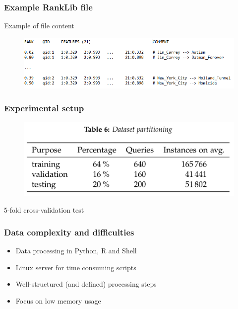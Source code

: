 \begin{frame}
  \frametitle{Example RankLib file}
  

  
    \begin{exampleblock}{Example of file content}	
   \begin{figure}[tbph]
    \centering
    \includegraphics[width=1\linewidth]{images/ranklib_ex}
  \end{figure}
  \end{exampleblock}
  
\end{frame}

\begin{frame}
  \frametitle{Experimental setup}
  
  
   \begin{figure}[tbph]
    \centering
    \includegraphics[width=0.7\linewidth]{images/expset}
  \end{figure}
  
  \centerline{5-fold cross-validation test}
  
  
\end{frame}

\begin{frame}
  \frametitle{Data complexity and difficulties}
  
  \begin{itemize}
\item Data processing in Python, R and Shell
\item Linux server for time consuming scripts
\item Well-structured (and defined) processing steps
\item Focus on low memory usage
\end{itemize}
  
  
\end{frame}

